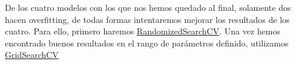 De los cuatro modelos con los que nos hemos quedado al final, solamente dos hacen \gls{overfitting}, de todas formas intentaremos mejorar los resultados de los cuatro. Para ello, primero haremos \href{://scikit-learn.org/stable/modules/generated/sklearn.model_selection.RandomizedSearchCV.html}{RandomizedSearchCV}. Una vez hemos encontrado buenos resultados en el rango de parámetros definido, utilizamos \href{https://scikit-learn.org/stable/modules/generated/sklearn.model_selection.GridSearchCV.html}{GridSearchCV}